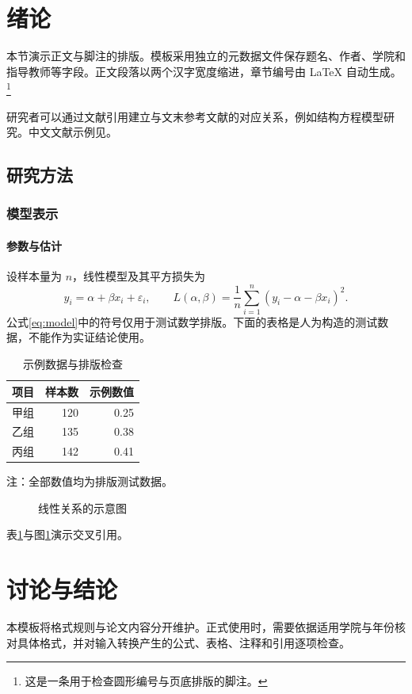 \section{绪论}
本节演示正文与脚注的排版。模板采用独立的元数据文件保存题名、作者、学院和指导教师等字段。正文段落以两个汉字宽度缩进，章节编号由 LaTeX 自动生成。\footnote{这是一条用于检查圆形编号与页底排版的脚注。}

研究者可以通过文献引用建立与文末参考文献的对应关系，例如结构方程模型研究\cite{fornell1981evaluating}。中文文献示例见\cite{孙鲁平2016网上个性化推荐研究述评与展望}。

\subsection{研究方法}
\subsubsection{模型表示}
\paragraph{参数与估计}
设样本量为 $n$，线性模型及其平方损失为
\begin{equation}\label{eq:model}
 y_i=\alpha+\beta x_i+\varepsilon_i,\qquad
 L(\alpha,\beta)=\frac{1}{n}\sum_{i=1}^{n}(y_i-\alpha-\beta x_i)^2.
\end{equation}
公式\eqref{eq:model}中的符号仅用于测试数学排版。下面的表格是人为构造的测试数据，不能作为实证结论使用。

\begin{table}[htbp]\centering
\caption{示例数据与排版检查}\label{tab:demo}
\begin{threeparttable}
\begin{tabular}{lrr}\toprule 项目 & 样本数 & 示例数值 \\\midrule
甲组 & 120 & 0.25 \\
乙组 & 135 & 0.38 \\
丙组 & 142 & 0.41 \\\bottomrule
\end{tabular}
\begin{tablenotes}\footnotesize\item 注：全部数值均为排版测试数据。\end{tablenotes}
\end{threeparttable}\end{table}

\begin{figure}[htbp]\centering
{}
\caption{线性关系的示意图}\label{fig:demo}
\end{figure}
表\ref{tab:demo}与图\ref{fig:demo}演示交叉引用。

\section{讨论与结论}
本模板将格式规则与论文内容分开维护。正式使用时，需要依据适用学院与年份核对具体格式，并对输入转换产生的公式、表格、注释和引用逐项检查。
